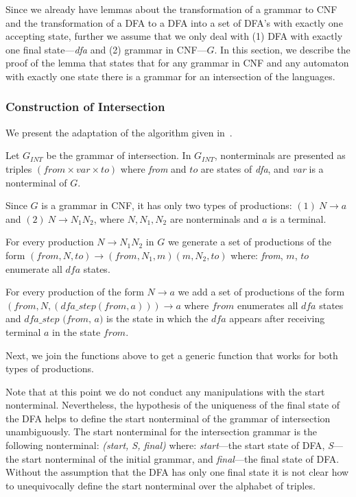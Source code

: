 Since we already have lemmas about the transformation of a grammar to CNF and the transformation of a DFA to a DFA into a set of DFA's with exactly one accepting state, further we assume that we only deal with (1) DFA with exactly one final state---\textit{dfa} and (2) grammar in CNF---$G$. In this section, we describe the proof of the lemma that states that for any grammar in CNF and any automaton with exactly one state there is a grammar for an intersection of the languages.

\subsubsection{Construction of Intersection}

We present the adaptation of the algorithm given in~\cite{beigelproof}.

Let $G_{INT}$ be the grammar of intersection. In $G_{INT}$, nonterminals are presented as triples $(\textit{from} \times var \times to) $ where \textit{from} and $to$ are states of \textit{dfa}, and \textit{var} is a nonterminal of $G$.

Since $G$ is a grammar in CNF, it has only two types of productions: $(1)\ N \to a $ and $(2) \ N \to N_{1} N_{2}$, where $N, N_1, N_2$ are nonterminals and $a$ is a terminal.

For every production $N \to N_1 N_2$ in $G$ we generate a set of productions of the form $(\textit{from}, N, to) \to (\textit{from}, N_1,  m) (m, N_2, to)$ where: \textit{from}, $m$, $to$ enumerate all $\textit{dfa}$ states.

For every production of the form $N \to a$ we add a set of productions of the form $(\textit{from}, N, (\textit{dfa\_step}(\textit{from}, a))) \to a$ where $\textit{from}$ enumerates all $\textit{dfa}$ states and $\textit{dfa\_step (from, a)}$ is the state in which the $\textit{dfa}$ appears after receiving terminal $a$ in the state $\textit{from}$.

Next, we join the functions above to get a generic function that works for both types of productions.

Note that at this point we do not conduct any manipulations with the start nonterminal. Nevertheless, the hypothesis of the uniqueness of the final state of the DFA helps to define the start nonterminal of the grammar of intersection unambiguously. The start nonterminal for the intersection grammar is the following nonterminal: \textit{(start, S, final)} where: \textit{start}---the start state of DFA, \textit{S}---the start nonterminal of the initial grammar, and \textit{final}---the final state of DFA. Without the assumption that the DFA has only one final state it is not clear how to unequivocally define the start nonterminal over the alphabet of triples.

